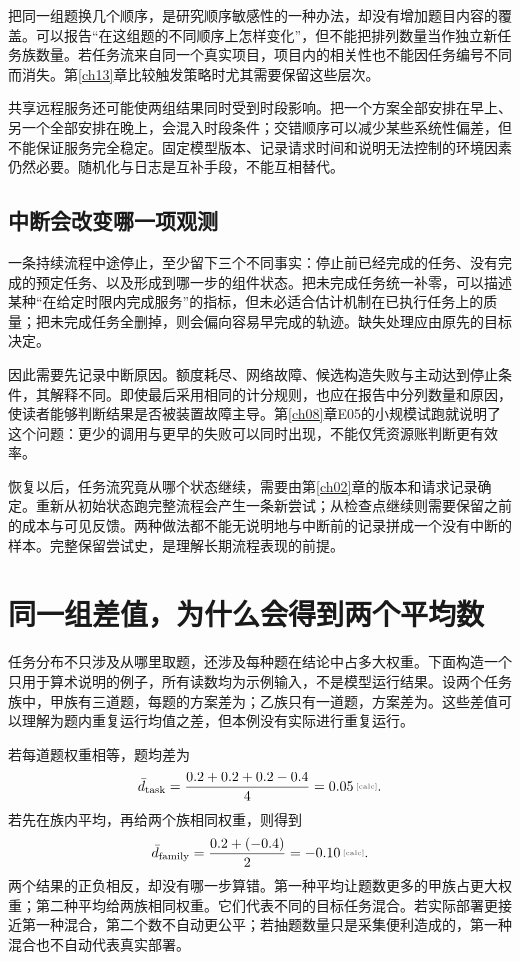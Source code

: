 把同一组题换几个顺序，是研究顺序敏感性的一种办法，却没有增加题目内容的覆盖。可以报告“在这组题的不同顺序上怎样变化”，但不能把排列数量当作独立新任务族数量。若任务流来自同一个真实项目，项目内的相关性也不能因任务编号不同而消失。第\ref{ch13}章比较触发策略时尤其需要保留这些层次。

共享远程服务还可能使两组结果同时受到时段影响。把一个方案全部安排在早上、另一个全部安排在晚上，会混入时段条件；交错顺序可以减少某些系统性偏差，但不能保证服务完全稳定。固定模型版本、记录请求时间和说明无法控制的环境因素仍然必要。随机化与日志是互补手段，不能互相替代。

\subsection{中断会改变哪一项观测}

一条持续流程中途停止，至少留下三个不同事实：停止前已经完成的任务、没有完成的预定任务、以及形成到哪一步的组件状态。把未完成任务统一补零，可以描述某种“在给定时限内完成服务”的指标，但未必适合估计机制在已执行任务上的质量；把未完成任务全删掉，则会偏向容易早完成的轨迹。缺失处理应由原先的目标决定。

因此需要先记录中断原因。额度耗尽、网络故障、候选构造失败与主动达到停止条件，其解释不同。即使最后采用相同的计分规则，也应在报告中分列数量和原因，使读者能够判断结果是否被装置故障主导。第\ref{ch08}章E05的小规模试跑就说明了这个问题：更少的调用与更早的失败可以同时出现，不能仅凭资源账判断更有效率。

恢复以后，任务流究竟从哪个状态继续，需要由第\ref{ch02}章的版本和请求记录确定。重新从初始状态跑完整流程会产生一条新尝试；从检查点继续则需要保留之前的成本与可见反馈。两种做法都不能无说明地与中断前的记录拼成一个没有中断的样本。完整保留尝试史，是理解长期流程表现的前提。

\section{同一组差值，为什么会得到两个平均数}
\label{sec:ch03-weighting-example}

任务分布不只涉及从哪里取题，还涉及每种题在结论中占多大权重。下面构造一个只用于算术说明的例子，所有读数均为示例输入，不是模型运行结果。设两个任务族中，甲族有三道题，每题的方案差为；乙族只有一道题，方案差为。这些差值可以理解为题内重复运行均值之差，但本例没有实际进行重复运行。

若每道题权重相等，题均差为
\begin{equation}
 \bar d_{\mathrm{task}}=
 \frac{0.2+0.2+0.2-0.4}{4}=\calcnum{0.05}.
 \label{eq:ch03-task-weighted}
\end{equation}
若先在族内平均，再给两个族相同权重，则得到
\begin{equation}
 \bar d_{\mathrm{family}}=
 \frac{0.2+(-0.4)}{2}=\calcnum{-0.10}.
 \label{eq:ch03-family-weighted}
\end{equation}
两个结果的正负相反，却没有哪一步算错。第一种平均让题数更多的甲族占更大权重；第二种平均给两族相同权重。它们代表不同的目标任务混合。若实际部署更接近第一种混合，第二个数不自动更公平；若抽题数量只是采集便利造成的，第一种混合也不自动代表真实部署。


